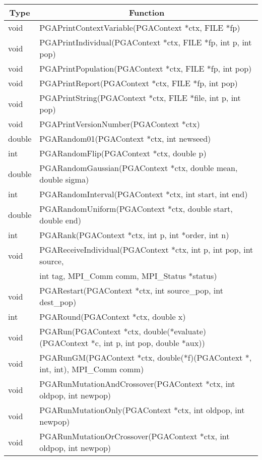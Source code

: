 \documentclass{report}
\begin{document}
\begin{tabular}{|l|l|} \hline\hline
\multicolumn{1}{|c|}{Type} &
\multicolumn{1}{c|}{Function}  \\  \hline\hline
void &  PGAPrintContextVariable(PGAContext *ctx, FILE *fp) \\ \hline
void &  PGAPrintIndividual(PGAContext *ctx, FILE *fp, int p, int pop) \\ \hline
void &  PGAPrintPopulation(PGAContext *ctx, FILE *fp, int pop) \\ \hline
void &  PGAPrintReport(PGAContext *ctx, FILE *fp, int pop) \\ \hline
void &  PGAPrintString(PGAContext *ctx, FILE *file, int p, int pop) \\ \hline
void &  PGAPrintVersionNumber(PGAContext *ctx) \\ \hline
double &  PGARandom01(PGAContext *ctx, int newseed) \\ \hline
int &  PGARandomFlip(PGAContext *ctx, double p) \\ \hline
double &  PGARandomGaussian(PGAContext *ctx, double mean, double sigma) \\ \hline
int &  PGARandomInterval(PGAContext *ctx, int start, int end) \\ \hline
double &  PGARandomUniform(PGAContext *ctx, double start, double end) \\ \hline
int &  PGARank(PGAContext *ctx, int p, int *order, int n) \\ \hline
void &  PGAReceiveIndividual(PGAContext *ctx, int p, int pop, int source, \\
     &  int tag, MPI\_Comm comm, MPI\_Status *status) \\ \hline
void &  PGARestart(PGAContext *ctx, int source\_pop, int dest\_pop) \\ \hline
int &  PGARound(PGAContext *ctx, double x) \\ \hline
void &  PGARun(PGAContext *ctx, double(*evaluate)(PGAContext *c, int p, int
pop, double *aux)) \\ \hline
void &  PGARunGM(PGAContext *ctx, double(*f)(PGAContext *, int, int), MPI\_Comm
comm) \\ \hline
void &  PGARunMutationAndCrossover(PGAContext *ctx, int oldpop, int newpop) \\
\hline
void &  PGARunMutationOnly(PGAContext *ctx, int oldpop, int newpop) \\ \hline
void &  PGARunMutationOrCrossover(PGAContext *ctx, int oldpop, int newpop) \\ \hline

\end{tabular}
\end{document}
